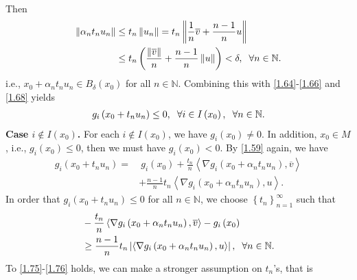 \documentclass[a4paper]{article}
\numberwithin{equation}{section}
\begin{document}
\begin{enumerate}
\begin{align}
\end{align}
Then
\begin{align}
\left\| {{\alpha _n}{t_n}{u_n}} \right\| &\le {t_n}\left\| {{u_n}} \right\| = {t_n}\left\| {\frac{1}{n}\overline v  + \frac{{n - 1}}{n}u} \right\|\\
 &\le {t_n}\left( {\frac{{\left\| {\overline v } \right\|}}{n} + \frac{{n - 1}}{n}\left\| u \right\|} \right) < \delta ,\hspace{0.2cm}\forall n \in \mathbb{N}.
\end{align}
i.e., ${x_0} + {\alpha _n}{t_n}{u_n} \in {B_\delta }\left( {{x_0}} \right)$ for all $n\in \mathbb{N}$. Combining this with \eqref{1.64}-\eqref{1.66} and \eqref{1.68} yields
\begin{align}
\label{1.72}
{g_i}\left( {{x_0} + {t_n}{u_n}} \right) \le 0,\hspace{0.2cm} \forall i \in I\left( {{x_0}} \right),\hspace{0.2cm} \forall n \in \mathbb{N}.
\end{align}
\textbf{Case $i\notin I\left(x_0\right)$.} For each $i\notin I\left(x_0\right)$, we have $g_i\left(x_0\right)\ne 0$. In addition, $x_0\in M$, i.e., $g_i\left(x_0\right) \le 0$, then we must have $g_i\left(x_0\right) <0$. By \eqref{1.59} again, 
we have
\begin{align}
{g_i}\left( {{x_0} + {t_n}{u_n}} \right) =&\ {g_i}\left( {{x_0}} \right) + \frac{{{t_n}}}{n}\left\langle {\nabla {g_i}\left( {{x_0} + {\alpha _n}{t_n}{u_n}} \right),\overline v } \right\rangle \\
& + \frac{{n - 1}}{n}{t_n}\left\langle {\nabla {g_i}\left( {{x_0} + {\alpha _n}{t_n}{u_n}} \right),u} \right\rangle .
\end{align}
In order that ${g_i}\left( {{x_0} + {t_n}{u_n}} \right) \le 0$ for all $n\in \mathbb{N}$, we choose $\left\{ {{t_n}} \right\}_{n = 1}^\infty $ such that
\begin{align}
\label{1.75}
& - \frac{{{t_n}}}{n}\left\langle {\nabla {g_i}\left( {{x_0} + {\alpha _n}{t_n}{u_n}} \right),\overline v } \right\rangle  - {g_i}\left( {{x_0}} \right)\\
& \ge  \frac{{n - 1}}{n}{t_n}\left| {\left\langle {\nabla {g_i}\left( {{x_0} + {\alpha _n}{t_n}{u_n}} \right),u} \right\rangle } \right|,\hspace{0.2cm}\forall n \in \mathbb{N}. \label{1.76}
\end{align}
To \eqref{1.75}-\eqref{1.76} holds, we can make a stronger assumption on $t_n$'s, that is
\begin{align}

\end{align}
\end{enumerate}
\end{document}
